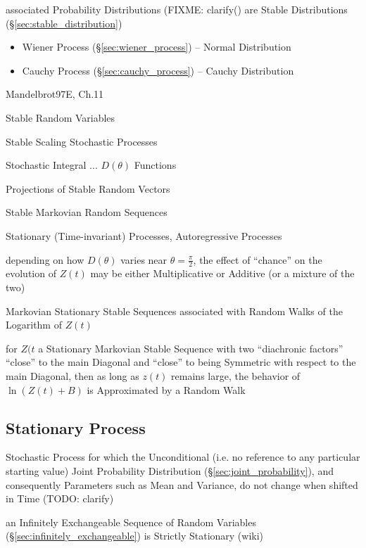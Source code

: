 associated Probability Distributions (FIXME: clarify() are Stable Distributions
(\S\ref{sec:stable_distribution})

\begin{itemize}
  \item Wiener Process (\S\ref{sec:wiener_process}) -- Normal Distribution
  \item Cauchy Process (\S\ref{sec:cauchy_process}) -- Cauchy Distribution
\end{itemize}

Mandelbrot97E, Ch.11

Stable Random Variables

Stable Scaling Stochastic Processes

Stochastic Integral ... $D(\theta)$ Functions

Projections of Stable Random Vectors

Stable Markovian Random Sequences

Stationary (Time-invariant) Processes, Autoregressive Processes

depending on how $D(\theta)$ varies near $\theta = \frac{\pi}{2}$, the effect of
``chance'' on the evolution of $Z(t)$ may be either Multiplicative or Additive
(or a mixture of the two)

Markovian Stationary Stable Sequences associated with Random Walks of the
Logarithm of $Z(t)$

for $Z(t$ a Stationary Markovian Stable Sequence with two ``diachronic factors''
``close'' to the main Diagonal and ``close'' to being Symmetric with respect to
the main Diagonal, then as long as $z(t)$ remains large, the behavior of
$\ln(Z(t) + B)$ is Approximated by a Random Walk



\subsection{Stationary Process}\label{sec:stationary_process}

Stochastic Process for which the Unconditional (i.e. no reference to any
particular starting value) Joint Probability Distribution
(\S\ref{sec:joint_probability}), and consequently Parameters such as Mean and
Variance, do not change when shifted in Time (TODO: clarify)

\fist an Infinitely Exchangeable Sequence of Random Variables
(\S\ref{sec:infinitely_exchangeable}) is Strictly Stationary (wiki)

